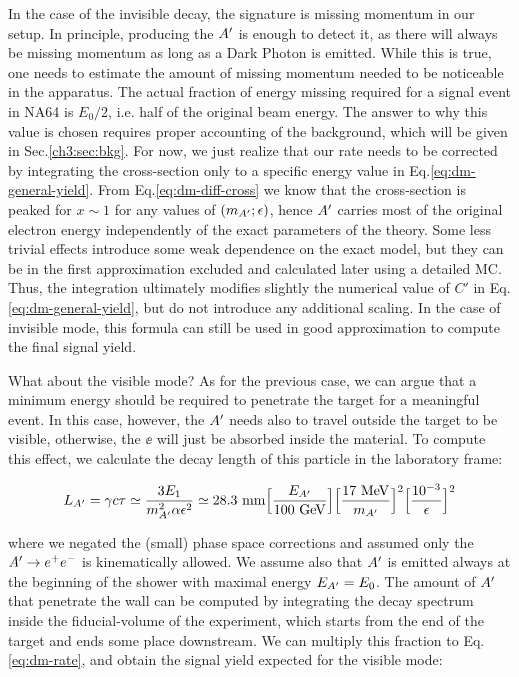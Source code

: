 In the case of the invisible decay, the signature is missing momentum in our setup. In principle, producing the $A'$ is enough to detect it, as there will always be missing momentum as long as a Dark Photon is emitted. While this is true, one needs to estimate the amount of missing momentum needed to be noticeable in the apparatus. The actual fraction of energy missing required for a signal event in NA64 is $E_0/2$, i.e. half of the original beam energy. The answer to why this value is chosen requires proper accounting of the background, which will be given in Sec.\ref{ch3:sec:bkg}.  For now, we just realize that our rate needs to be corrected by integrating the cross-section only to a specific energy value in Eq.\ref{eq:dm-general-yield}. From Eq.\ref{eq:dm-diff-cross} we know that the cross-section is peaked for $x \sim 1$ for any values of $(m_{A'};\epsilon)$, hence $A'$ carries most of the original electron energy independently of the exact parameters of the theory. Some less trivial effects introduce some weak dependence on the exact model, but they can be in the first approximation excluded and calculated later using a detailed MC. Thus, the integration ultimately modifies slightly the numerical value of $C'$ in Eq.\ref{eq:dm-general-yield}, but do not introduce any additional scaling. In the case of invisible mode, this formula can still be used in good approximation to compute the final signal yield.

What about the visible mode? As for the previous case, we can argue that a minimum energy should be required to penetrate the target for a meaningful event. In this case, however, the $A'$ needs also to travel outside the target to be visible, otherwise, the $\ee$ will just be absorbed inside the material. To compute this effect, we calculate the decay length of this particle in the laboratory frame:

\begin{eqnarray}
  L_{A'} = \gamma c \tau \simeq \frac{3E_1}{m^2_{A'}\alpha \epsilon^2} \simeq 28.3 ~{\rm mm}  \Bigl[\frac{E_{A'}}{100~ {\rm GeV}}\Bigr] 
  \Bigl[\frac{17~ {\rm MeV}}{m_{A'}}\Bigr]^2 \Bigl[\frac{10^{-3}}{\epsilon}\Bigr]^2
  \label{eq:dm-decay-length}
\end{eqnarray}

where we negated the (small) phase space corrections and assumed only the $A' \to e^+e^-$ is kinematically allowed. We assume also that $A'$ is emitted always at the beginning of the shower with maximal energy $E_{A'} = E_0$. The amount of $A'$ that penetrate the wall can be computed by integrating the decay spectrum inside the fiducial-volume of the experiment, which starts from the end of the target and ends some place downstream. We can multiply this fraction to Eq.\ref{eq:dm-rate}, and obtain the signal yield expected for the visible mode:

